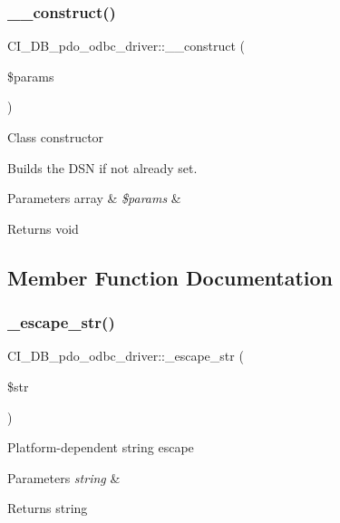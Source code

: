 \subsubsection{\texorpdfstring{\+\_\+\+\_\+construct()}{\_\_construct()}}
{\footnotesize\ttfamily C\+I\+\_\+\+D\+B\+\_\+pdo\+\_\+odbc\+\_\+driver\+::\+\_\+\+\_\+construct (\begin{DoxyParamCaption}\item[{}]{\$params }\end{DoxyParamCaption})}

Class constructor

Builds the D\+SN if not already set.


\begin{DoxyParams}[1]{Parameters}
array & {\em \$params} & \\
\hline
\end{DoxyParams}
\begin{DoxyReturn}{Returns}
void 
\end{DoxyReturn}


\subsection{Member Function Documentation}
\mbox{\label{class_c_i___d_b__pdo__odbc__driver_a1cab1022ffa6703fea41afce5f4251ae}} 
\subsubsection{\texorpdfstring{\+\_\+escape\+\_\+str()}{\_escape\_str()}}
{\footnotesize\ttfamily C\+I\+\_\+\+D\+B\+\_\+pdo\+\_\+odbc\+\_\+driver\+::\+\_\+escape\+\_\+str (\begin{DoxyParamCaption}\item[{}]{\$str }\end{DoxyParamCaption})\hspace{0.3cm}{\ttfamily [protected]}}

Platform-\/dependent string escape


\begin{DoxyParams}{Parameters}
{\em string} & \\
\hline
\end{DoxyParams}
\begin{DoxyReturn}{Returns}
string 
\end{DoxyReturn}
\mbox{\label{class_c_i___d_b__pdo__odbc__driver_aab84b252b1074b3090c726736582d00c}} 
